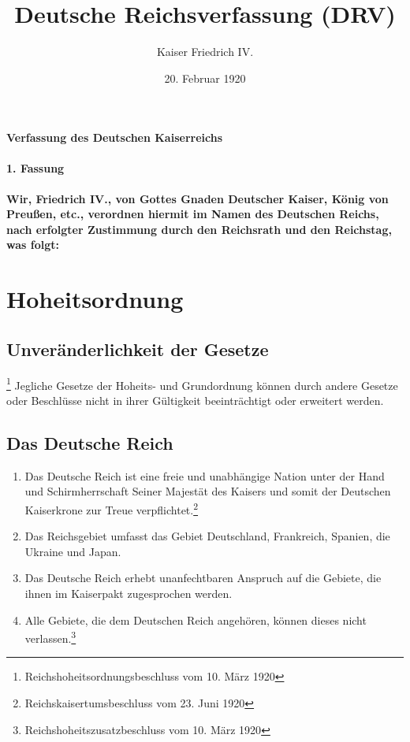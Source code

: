\documentclass{article}
\title{Deutsche Reichsverfassung (DRV)}
\author{Kaiser Friedrich IV.}
\date{20. Februar 1920}
\newenvironment*{pg}{\begin{enumerate}[(1)]}{\end{enumerate}}
\begin{document}
\maketitle
\vspace*{\fill}
\paragraph{Verfassung des Deutschen Kaiserreichs}

\newpage
{}
\vspace*{\fill}
\begin{Center}
\textbf{1. Fassung}
\vspace*{\fill}
\end{Center}
\newpage
{}
\vspace*{\fill}
\paragraph*{Wir, Friedrich IV., von Gottes Gnaden Deutscher Kaiser, König von Preußen, etc., verordnen
hiermit im Namen des Deutschen Reichs, nach erfolgter Zustimmung durch den Reichsrath und den Reichstag,
was folgt:}
\vspace*{\fill}
\newpage
\tableofcontents
\newpage
\section{Hoheitsordnung}
\subsection{Unveränderlichkeit der Gesetze}\footnote{Reichshoheitsordnungsbeschluss vom 10. März 1920}
Jegliche Gesetze der Hoheits- und Grundordnung können durch andere Gesetze oder Beschlüsse nicht in ihrer Gültigkeit beeinträchtigt oder erweitert werden.

\subsection{Das Deutsche Reich}
\begin{pg}
    \item Das Deutsche Reich ist eine freie und unabhängige Nation unter der Hand und Schirmherrschaft Seiner Majestät des Kaisers und somit der Deutschen Kaiserkrone zur Treue verpflichtet.\footnote{Reichskaisertumsbeschluss vom 23. Juni 1920}
    \item Das Reichsgebiet umfasst das Gebiet Deutschland, Frankreich, Spanien, die Ukraine und Japan.
    \item Das Deutsche Reich erhebt unanfechtbaren Anspruch auf die Gebiete, die ihnen im Kaiserpakt zugesprochen werden.
    \item Alle Gebiete, die dem Deutschen Reich angehören, können dieses nicht verlassen.\footnote{Reichshoheitszusatzbeschluss vom 10. März 1920}
\end{pg}
\end{document}
